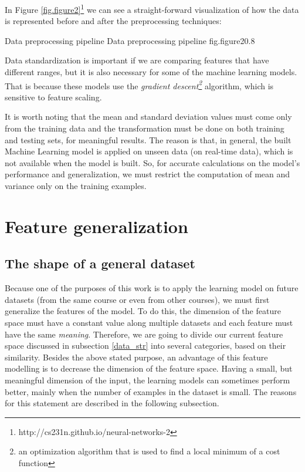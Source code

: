 In Figure \ref{fig.figure2}\footnote{http://cs231n.github.io/neural-networks-2} we can 
see a straight-forward visualization of how the data is represented before and after 
the preprocessing techniques:

%
    {Data preprocessing pipeline}%
    {Data preprocessing pipeline}%
    {fig.figure2}{0.8}

Data standardization is important if we are comparing features that have different 
ranges, but it is also necessary for some of the machine learning models. That is 
because these models use the {\it gradient descent\footnote{an optimization algorithm
that is used to find a local minimum of a cost function}} algorithm, which is 
sensitive to feature scaling.

It is worth noting that the mean and standard deviation values must come only 
from the training data and the transformation must be done on both training and 
testing sets, for meaningful results. The reason is that, in general, the built 
Machine Learning model is applied on unseen data (on real-time data), which is 
not available when the model is built. So, for accurate calculations on the 
model's performance and generalization, we must restrict the computation of 
mean and variance only on the training examples.

\section{Feature generalization}

\subsection{The shape of a general dataset}

Because one of the purposes of this work is to apply the learning model 
on future datasets (from the same course or even from other courses), 
we must first generalize the features of the model. To do this, the dimension 
of the feature space must have a constant value along multiple datasets 
and each feature must have the same {\it meaning}. Therefore, we are going 
to divide our current feature space discussed in subsection \ref{data_str} 
into several categories, based on their similarity. Besides the above stated 
purpose, an advantage of this feature modelling is to decrease the dimension 
of the feature space. Having a small, but meaningful dimension of the input, 
the learning models can sometimes perform better, mainly when the number of 
examples in the dataset is small. The reasons for this statement are described 
in the following subsection. 

